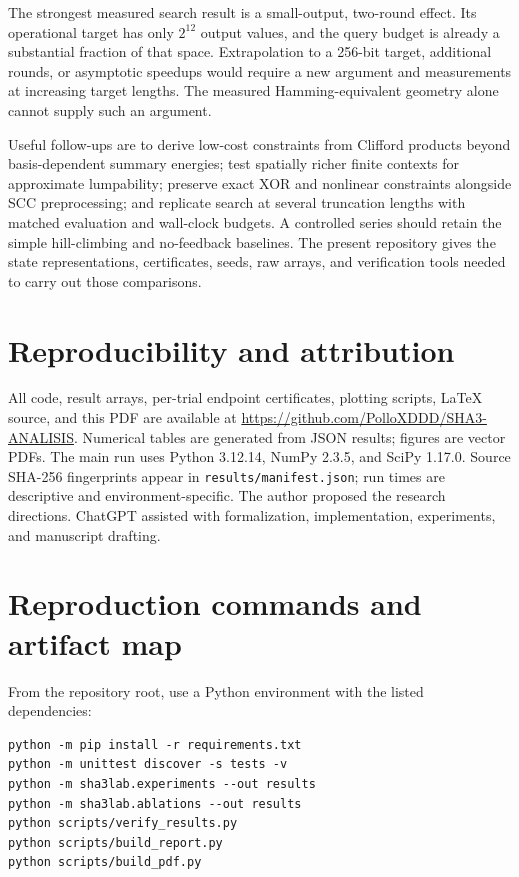 \documentclass[11pt]{article}
\begin{document}
The strongest measured search result is a small-output, two-round effect. Its operational target has only $2^{12}$ output values, and the query budget is already a substantial fraction of that space. Extrapolation to a 256-bit target, additional rounds, or asymptotic speedups would require a new argument and measurements at increasing target lengths. The measured Hamming-equivalent geometry alone cannot supply such an argument.

Useful follow-ups are to derive low-cost constraints from Clifford products beyond basis-dependent summary energies; test spatially richer finite contexts for approximate lumpability; preserve exact XOR and nonlinear constraints alongside SCC preprocessing; and replicate search at several truncation lengths with matched evaluation and wall-clock budgets. A controlled series should retain the simple hill-climbing and no-feedback baselines. The present repository gives the state representations, certificates, seeds, raw arrays, and verification tools needed to carry out those comparisons.

\section*{Reproducibility and attribution}

All code, result arrays, per-trial endpoint certificates, plotting scripts, LaTeX source, and this PDF are available at \url{https://github.com/PolloXDDD/SHA3-ANALISIS}. Numerical tables are generated from JSON results; figures are vector PDFs. The main run uses Python 3.12.14, NumPy 2.3.5, and SciPy 1.17.0. Source SHA-256 fingerprints appear in \texttt{results/manifest.json}; run times are descriptive and environment-specific. The author proposed the research directions. ChatGPT assisted with formalization, implementation, experiments, and manuscript drafting.




\clearpage
\appendix
\section{Reproduction commands and artifact map}

From the repository root, use a Python environment with the listed dependencies:
\begin{verbatim}
python -m pip install -r requirements.txt
python -m unittest discover -s tests -v
python -m sha3lab.experiments --out results
python -m sha3lab.ablations --out results
python scripts/verify_results.py
python scripts/build_report.py
python scripts/build_pdf.py
\end{verbatim}
\end{document}
